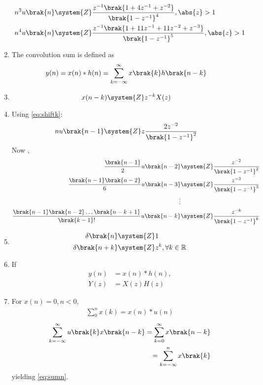 \begin{enumerate}[label=\thesubsection.\arabic*,ref=\thesubsection.\theenumi]
\begin{align}
         n^3 u\brak{n} & \system{Z} \frac{z^{-1}\brak{1+4z^{-1}+z^{-2}}}{\brak{1-z^{-1}}^4} ,   \abs{z} >1\label{eq:11.9.5.26.4} \\
       n^4 u\brak{n} & \system{Z} \frac{z^{-1}\brak{1+11z^{-1}+11z^{-2}+z^{-3}}}{\brak{1-z^{-1}}^5},\abs{z}>1
	\label{eq:11.9.5.26.5}  
\end{align} 
\item The convolution sum is defined as
\begin{align}
	y(n) &= x(n)* h(n) = \sum_{k=-\infty}^{\infty}x\brak{k}h\brak{n-k}
	\label{eq:conv}
\end{align}
\item 
\begin{align}
	x(n-k) &\system{Z} z^{-k}X(z)
\label{eq:shiftk}
\end{align}
\item Using \eqref{eq:shiftk}:
 \begin{align}
         nu\brak{n-1}&\system{Z} z\frac{2z^{-2}}{\brak{1-z^{-1}}^2}
    \end{align}
 Now , 
    \begin{align}
         \frac{\brak{n-1}}{2}u\brak{n-2} & \system{Z} \frac{z^{-2}}{\brak{1-z^{-1}}^2} \\
         \frac{\brak{n-1}\brak{n-2}}{6}u\brak{n-3}&\system{Z} \frac{z^{-3}}{\brak{1-z^{-1}}^3}\\
         \vdots \notag \\
          \frac{\brak{n-1}\brak{n-2}\ldots \brak{n-k+1}}{\brak{k-1}!}u\brak{n-k}&\system{Z} \frac{z^{-k}}{\brak{1-z^{-1}}^k}\label{eq:11.9.5.26.8}
    \end{align}
\item
\begin{align}
	\delta\brak{n} &\system{Z} 1 \\
	\delta\brak{n+k} &\system{Z}z^{k} ,\forall k\in \mathbb{R} \label{11027_delta_func}
\end{align}
\item If 
\begin{align}
	y(n) &= x(n)*h(n),
	\\
	Y(z)&=X(z)H(z)
\label{eq:prodz}
\end{align}
\item For 
$x(n) = 0, n < 0$,
	\begin{align}
	\sum_{0}^{n}x(k) = x(n)*u(n)
	\label{eq:sumn}
	\end{align}
	\solution 
\begin{align}
	  \sum_{k=-\infty}^{\infty}u\brak{k}x\brak{n-k}
	 = \sum_{k=0}^{\infty}x\brak{n-k}
	 \\
	 = \sum_{k=-\infty}^{n}x\brak{k}
\end{align}
yielding 
	\eqref{eq:sumn}.
\end{enumerate}
